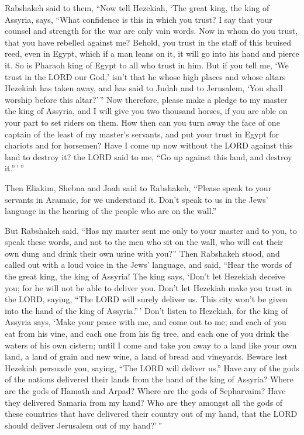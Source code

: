  Rabshakeh said to them, ``Now tell Hezekiah, `The great
king, the king of Assyria, says, ``What confidence is this in which you
trust?  I say that your counsel and strength for the war
are only vain words. Now in whom do you trust, that you have rebelled
against me?  Behold, you trust in the staff of this
bruised reed, even in Egypt, which if a man leans on it, it will go into
his hand and pierce it. So is Pharaoh king of Egypt to all who trust in
him.  But if you tell me, `We trust in the LORD our God,'
isn't that he whose high places and whose altars Hezekiah has taken
away, and has said to Judah and to Jerusalem, `You shall worship before
this altar?'\,''  Now therefore, please make a pledge to
my master the king of Assyria, and I will give you two thousand horses,
if you are able on your part to set riders on them.  How
then can you turn away the face of one captain of the least of my
master's servants, and put your trust in Egypt for chariots and for
horsemen?  Have I come up now without the LORD against
this land to destroy it? the LORD said to me, ``Go up against this land,
and destroy it.''\,'\,''

 Then Eliakim, Shebna and Joah said to Rabshakeh,
``Please speak to your servants in Aramaic, for we understand it. Don't
speak to us in the Jews' language in the hearing of the people who are
on the wall.''

 But Rabshakeh said, ``Has my master sent me only to your
master and to you, to speak these words, and not to the men who sit on
the wall, who will eat their own dung and drink their own urine with
you?''  Then Rabshakeh stood, and called out with a loud
voice in the Jews' language, and said, ``Hear the words of the great
king, the king of Assyria!  The king says, `Don't let
Hezekiah deceive you; for he will not be able to deliver you.
 Don't let Hezekiah make you trust in the LORD, saying,
``The LORD will surely deliver us. This city won't be given into the
hand of the king of Assyria.''\,'  Don't listen to
Hezekiah, for the king of Assyria says, `Make your peace with me, and
come out to me; and each of you eat from his vine, and each one from his
fig tree, and each one of you drink the waters of his own cistern;
 until I come and take you away to a land like your own
land, a land of grain and new wine, a land of bread and vineyards.
 Beware lest Hezekiah persuade you, saying, ``The LORD
will deliver us.'' Have any of the gods of the nations delivered their
lands from the hand of the king of Assyria?  Where are
the gods of Hamath and Arpad? Where are the gods of Sepharvaim? Have
they delivered Samaria from my hand?  Who are they
amongst all the gods of these countries that have delivered their
country out of my hand, that the LORD should deliver Jerusalem out of my
hand?'\,''

